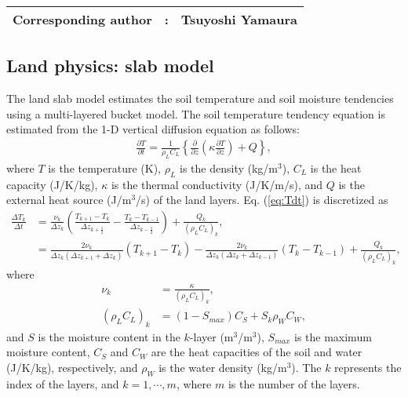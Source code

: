 {\bf \Large
\begin{tabular}{ccc}
\hline
  Corresponding author & : & Tsuyoshi Yamaura\\
\hline
\end{tabular}
}


\subsection{Land physics: slab model}

The land slab model estimates the soil temperature and soil moisture tendencies using a multi-layered bucket model.
The soil temperature tendency equation is estimated from the 1-D vertical diffusion equation as follows:
\begin{align}
  \frac{\partial T}{\partial t} = \frac{1}{\rho_{L}C_{L}} \left\{ \frac{\partial}{\partial z} \left( \kappa \frac{\partial T}{\partial z} \right) + Q \right\},
  \label{eq:Tdt}
\end{align}
where $T$ is the temperature (K), $\rho_{L}$ is the density (kg/m$^3$), $C_{L}$ is the heat capacity (J/K/kg), $\kappa$ is the thermal conductivity (J/K/m/s), and $Q$ is the external heat source (J/m$^3$/s) of the land layers.
Eq. (\ref{eq:Tdt}) is discretized as
\begin{align}
  \frac{\Delta T_{k}}{\Delta t} &= \frac{\nu_{k}}{\Delta z_{k}} \left( \frac{T_{k+1}-T_{k}}{\Delta z_{k+\frac{1}{2}}} - \frac{T_{k}-T_{k-1}}{\Delta z_{k-\frac{1}{2}}} \right) + \frac{Q_{k}}{(\rho_{L}C_{L})_{k}}, \\
                                &= \frac{ 2\nu_{k} }{ \Delta z_{k} (\Delta z_{k+1}+\Delta z_{k}) }(T_{k+1}-T_{k}) - \frac{ 2\nu_{k} }{ \Delta z_{k} (\Delta z_{k}+\Delta z_{k-1}) }(T_{k}-T_{k-1}) +\frac{Q_{k}}{(\rho_{L}C_{L})_{k}},
\end{align}
where
\begin{align}
  \nu_{k} &= \frac{\kappa}{(\rho_{L}C_{L})_{k}}, \\
  (\rho_{L}C_{L})_{k} &= ( 1 - S_{max} ) C_{S} + S_{k} \rho_{W}C_{W},
\end{align}
and $S$ is the moisture content in the $k$-layer (m$^3$/m$^3$), $S_{max}$ is the maximum moisture content, $C_{S}$ and $C_{W}$ are the heat capacities of the soil and water (J/K/kg), respectively, and $\rho_{W}$ is the water density (kg/m$^3$).
The $k$ represents the index of the layers, and $k = 1, \cdots, m$, where $m$ is the number of the layers.
